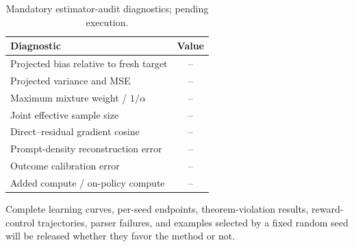 \documentclass{article}
\begin{document}
\begin{table}[h]
\caption{Mandatory estimator-audit diagnostics; pending execution.}
\centering
\begin{tabular}{lc}
\toprule
Diagnostic & Value \\
\midrule
Projected bias relative to fresh target & -- \\
Projected variance and MSE & -- \\
Maximum mixture weight / $1/\alpha$ & -- \\
Joint effective sample size & -- \\
Direct--residual gradient cosine & -- \\
Prompt-density reconstruction error & -- \\
Outcome calibration error & -- \\
Added compute / on-policy compute & -- \\
\bottomrule
\end{tabular}
\end{table}

Complete learning curves, per-seed endpoints, theorem-violation results,
reward-control trajectories, parser failures, and examples selected by a
fixed random seed will be released whether they favor the method or not.
\end{document}
